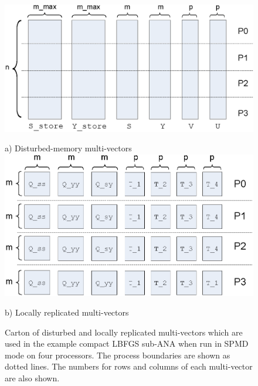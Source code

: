 {\bsinglespace
\begin{figure}
\begin{center}

\includegraphics*[angle=0,scale=0.60]{SPMD_Dist_MVs_P4}

a) Disturbed-memory multi-vectors \\[3ex]

\includegraphics*[angle=0,scale=0.60]{SPMD_Locally_Replicated_MVs_P4}

b) Locally replicated multi-vectors

\end{center}
\caption{
\label{tsfcore:fig:SPMD_MVs_P4}
Carton of disturbed and locally replicated multi-vectors which are
used in the example compact LBFGS sub-ANA when run in SPMD mode on
four processors.  The process boundaries are shown as dotted lines.
The numbers for rows and columns of each multi-vector are also shown.}
\end{figure}
\esinglespace}

